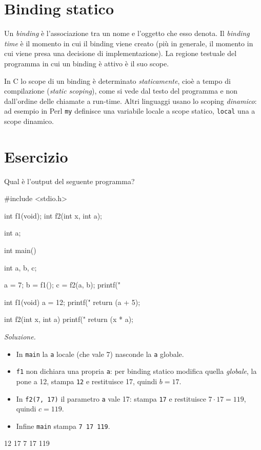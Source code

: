 \documentclass[11pt,a4paper]{article}
\begin{document}
\section{Binding statico}

\begin{definizione}
Un \emph{binding} è l'associazione tra un nome e l'oggetto che esso denota. Il
\emph{binding time} è il momento in cui il binding viene creato (più in
generale, il momento in cui viene presa una decisione di implementazione). La
regione testuale del programma in cui un binding è attivo è il suo scope.
\end{definizione}

In C lo scope di un binding è determinato \emph{staticamente}, cioè a tempo di
compilazione (\emph{static scoping}), come si vede dal testo del programma e non
dall'ordine delle chiamate a run-time. Altri linguaggi usano lo scoping
\emph{dinamico}: ad esempio in Perl \lstinline|my| definisce una variabile
locale a scope statico, \lstinline|local| una a scope dinamico.

\section{Esercizio}

\begin{esercizio}
Qual è l'output del seguente programma?
\begin{codice}
#include <stdio.h>

int f1(void);
int f2(int x, int a);

int a;

int main() {
    int a, b, c;

    a = 7;
    b = f1();
    c = f2(a, b);
    printf("%
}

int f1(void) {
    a = 12;
    printf("%
    return (a + 5);
}

int f2(int x, int a) {
    printf("%
    return (x * a);
}
\end{codice}
\end{esercizio}

\emph{Soluzione.}
\begin{itemize}
    \item In \lstinline|main| la \lstinline|a| locale (che vale 7) nasconde la
          \lstinline|a| globale.
    \item \lstinline|f1| non dichiara una propria \lstinline|a|: per binding
          statico modifica quella \emph{globale}, la pone a 12, stampa
          \texttt{12} e restituisce 17, quindi $b = 17$.
    \item In \lstinline|f2(7, 17)| il parametro \lstinline|a| vale 17: stampa
          \texttt{17} e restituisce $7 \cdot 17 = 119$, quindi $c = 119$.
    \item Infine \lstinline|main| stampa \texttt{7 17 119}.
\end{itemize}
\begin{risultato}
12 17 7 17 119
\end{risultato}
\end{document}

